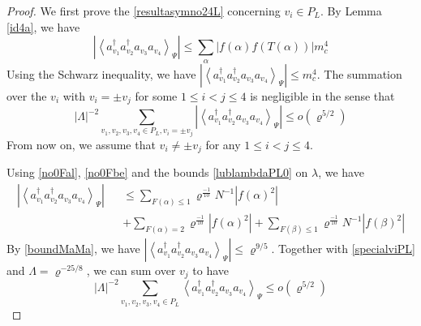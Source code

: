 \documentclass[11pt]{article}
\numberwithin{equation}{section}
\newcommand{\beq}{\begin{equation}}
\newcommand{\eeq}{\end{equation}}
\newcommand{\beqa}{\begin{eqnarray}}
\newcommand{\eeqa}{\end{eqnarray}}
\newcommand\al{{\alpha}}
\newcommand\be{\beta}
\renewcommand\rho\varrho
\theoremstyle{definition}
\begin{document}
\begin{proof}
We first prove the \eqref{resultasymno24L} concerning  $v_i\in P_L$. By Lemma \ref{id4a}, we have 
\beq
\left|\left\langle a_{v_1}^\dagger a_{v_2}^\dagger a_{v_3}a_{v_4}\right\rangle_{\Psi}\right|\leq \sum_{\al}\left|f(\al)
f(T(\al))\right| m_c^4
\eeq
Using the Schwarz inequality, we have $\left|\left\langle a_{v_1}^\dagger a_{v_2}^\dagger a_{v_3}a_{v_4}\right\rangle_{\Psi}\right|\leq m_c^4$. The summation  over the $v_i$ with $v_i=\pm v_j$ for some $1\leq i<j\leq 4 $
is negligible in the sense that  
\beq\label{specialviPL}
{|\Lambda|}^{-2} \sum_{v_1,v_2,v_3,v_4\in P_L, v_i=\pm v_j} \left | \left\langle a_{v_1}^\dagger a_{v_2}^\dagger a_{v_3}a_{v_4}\right\rangle_{\Psi}  \right | \leq o(\rho^{5/2})
\eeq
{F}rom now on, we assume that  $v_i\neq \pm v_j$ for any  $1\leq i<j\leq 4 $.  

Using \eqref{no0Fal}, \eqref{no0Fbe}  and the bounds  \eqref{lublambdaPL0} on $\lambda$, we have 
\beqa\nonumber
\left|\left\langle a_{v_1}^\dagger a_{v_2}^\dagger a_{v_3}a_{v_4}\right\rangle_{\Psi}\right|&&\leq \sum_{F(\al)\leq 1}\rho^{\frac{-1}{10}}N^{-1}|f(\al)^2|\\\nonumber
&&+\sum_{F(\al)=2}\rho^{\frac{-1}{10}}|f(\al)^2|+\sum_{F(\be)\leq 1}\rho^{\frac{-1}{10}}N^{-1}|f(\be)^2|
\eeqa
By \eqref{boundMaMa}, we have $\left|\left\langle a_{v_1}^\dagger a_{v_2}^\dagger a_{v_3}a_{v_4}\right\rangle_{\Psi}\right|\leq \rho^{9/5} .  $ 
Together with \eqref{specialviPL} and  $\Lambda=\rho^{-25/8}$, we can sum over $v_{j}$ to have  
\beq
{|\Lambda|}^{-2} \sum_{v_1,v_2,v_3,v_4\in P_L}\left\langle a_{v_1}^\dagger a_{v_2}^\dagger a_{v_3}a_{v_4}\right\rangle_{\Psi}\leq o(\rho^{5/2})
\eeq



\end{proof}
\end{document}
